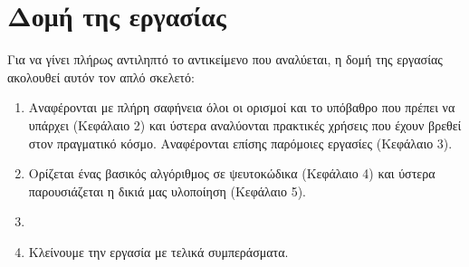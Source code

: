 \section{Δομή της εργασίας}
Για να γίνει πλήρως αντιληπτό το αντικείμενο που αναλύεται, η δομή της εργασίας ακολουθεί αυτόν τον απλό σκελετό:
\begin{enumerate}

\item Αναφέρονται με πλήρη σαφήνεια όλοι οι ορισμοί και το υπόβαθρο που πρέπει να υπάρχει (Κεφάλαιο 2) και ύστερα αναλύονται πρακτικές χρήσεις που έχουν βρεθεί στον πραγματικό κόσμο. Αναφέρονται επίσης παρόμοιες εργασίες (Κεφάλαιο 3).

\item Ορίζεται ένας βασικός αλγόριθμος σε ψευτοκώδικα (Κεφάλαιο 4) και ύστερα παρουσιάζεται η δικιά μας υλοποίηση (Κεφάλαιο 5).

\item 

\item Κλείνουμε την εργασία με τελικά συμπεράσματα.

\end{enumerate}

